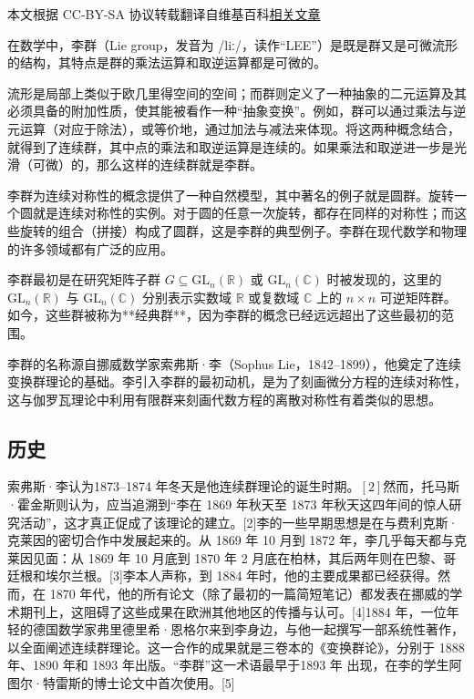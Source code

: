 
本文根据 CC-BY-SA 协议转载翻译自维基百科\href{https://en.wikipedia.org/wiki/Lie_group}{相关文章}

在数学中，李群（Lie group，发音为 /liː/，读作“LEE”）是既是群又是可微流形的结构，其特点是群的乘法运算和取逆运算都是可微的。

流形是局部上类似于欧几里得空间的空间；而群则定义了一种抽象的二元运算及其必须具备的附加性质，使其能被看作一种“抽象变换”。例如，群可以通过乘法与逆元运算（对应于除法），或等价地，通过加法与减法来体现。将这两种概念结合，就得到了连续群，其中点的乘法和取逆运算是连续的。如果乘法和取逆进一步是光滑（可微）的，那么这样的连续群就是李群。

李群为连续对称性的概念提供了一种自然模型，其中著名的例子就是圆群。旋转一个圆就是连续对称性的实例。对于圆的任意一次旋转，都存在同样的对称性；而这些旋转的组合（拼接）构成了圆群，这是李群的典型例子。李群在现代数学和物理的许多领域都有广泛的应用。

李群最初是在研究矩阵子群
$G \subseteq \mathrm{GL}_n(\mathbb{R})$ 或 $\mathrm{GL}_n(\mathbb{C})$ 时被发现的，这里的 $\mathrm{GL}_n(\mathbb{R})$ 与 $\mathrm{GL}_n(\mathbb{C})$ 分别表示实数域 $\mathbb{R}$ 或复数域 $\mathbb{C}$ 上的 $n \times n$ 可逆矩阵群。如今，这些群被称为**经典群**，因为李群的概念已经远远超出了这些最初的范围。

李群的名称源自挪威数学家索弗斯·李（Sophus Lie，1842–1899），他奠定了连续变换群理论的基础。李引入李群的最初动机，是为了刻画微分方程的连续对称性，这与伽罗瓦理论中利用有限群来刻画代数方程的离散对称性有着类似的思想。
\subsection{历史}
索弗斯·李认为1873–1874 年冬天是他连续群理论的诞生时期。\([2]\)然而，托马斯·霍金斯则认为，应当追溯到“李在 1869 年秋天至 1873 年秋天这四年间的惊人研究活动”，这才真正促成了该理论的建立。[2]李的一些早期思想是在与费利克斯·克莱因的密切合作中发展起来的。从 1869 年 10 月到 1872 年，李几乎每天都与克莱因见面：从 1869 年 10 月底到 1870 年 2 月底在柏林，其后两年则在巴黎、哥廷根和埃尔兰根。[3]李本人声称，到 1884 年时，他的主要成果都已经获得。然而，在 1870 年代，他的所有论文（除了最初的一篇简短笔记）都发表在挪威的学术期刊上，这阻碍了这些成果在欧洲其他地区的传播与认可。[4]1884 年，一位年轻的德国数学家弗里德里希·恩格尔来到李身边，与他一起撰写一部系统性著作，以全面阐述连续群理论。这一合作的成果就是三卷本的《变换群论》，分别于 1888 年、1890 年和 1893 年出版。“李群”这一术语最早于1893 年 出现，在李的学生阿图尔·特雷斯的博士论文中首次使用。[5]

